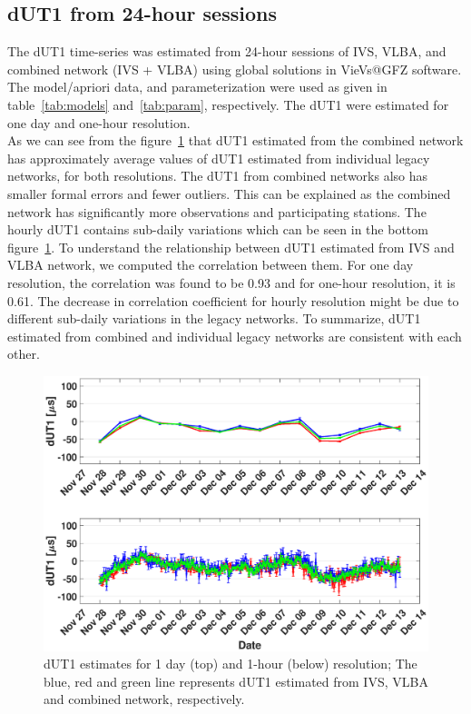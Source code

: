 \documentclass[smallextended]{svjour3}       %
\begin{document}
\subsection{dUT1 from 24-hour sessions}
The dUT1 time-series was estimated from 24-hour sessions of IVS, VLBA, and combined network (IVS + VLBA) using global solutions in VieVs@GFZ software. The model/apriori data, and parameterization were used as given in table~\ref{tab:models} and~\ref{tab:param}, respectively. The dUT1 were estimated for one day and one-hour resolution. \\
As we can see from the figure~\ref{fig:dut1} that dUT1 estimated from the combined network has approximately average values of dUT1 estimated from individual legacy networks, for both resolutions. The dUT1 from combined networks also has smaller formal errors and fewer outliers. This can be explained as the combined network has significantly more observations and participating stations. The hourly dUT1 contains sub-daily variations which can be seen in the bottom figure~\ref{fig:dut1}. To understand the relationship between dUT1 estimated from IVS and VLBA network, we computed the correlation between them. For one day resolution, the correlation was found to be 0.93 and for one-hour resolution, it is 0.61. The decrease in correlation coefficient for hourly resolution might be due to different sub-daily variations in the legacy networks. 
To summarize, dUT1 estimated from combined and individual legacy networks are consistent with each other. \\
\begin{figure}[h]
    \centering
    \includegraphics[scale=0.3]{dut1.eps}
    \caption{dUT1 estimates for 1 day (top) and 1-hour (below) resolution; The blue, red and green line represents dUT1 estimated from IVS, VLBA and combined network, respectively.}
    \label{fig:dut1}
\end{figure}
\end{document}
